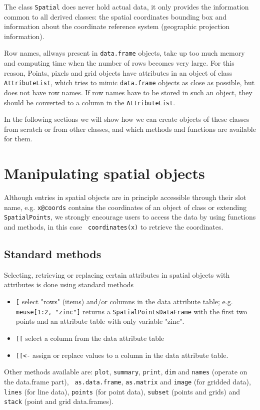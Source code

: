 \documentclass{article}
\begin{document}
The class {\tt Spatial} does never hold actual data, it only provides
the information common to all derived classes: the spatial coordinates
bounding box and information about the coordinate reference system
(geographic projection information).

Row names, allways present in {\tt data.frame} objects, take up too much
memory and computing time when the number of rows becomes very large. For
this reason, Points, pixels and grid objects have attributes in an object
of class {\tt AttributeList}, which tries to mimic {\tt data.frame}
objects as close as possible, but does not have row names. If row names
have to be stored in such an object, they should be converted to a column
in the {\tt AttributeList}.

In the following sections we will show how we can create objects of
these classes from scratch or from other classes, and which methods and
functions are available for them.

\section{Manipulating spatial objects}

Although entries in spatial objects are in principle accessible through
their slot name, e.g. {\tt x@coords} contains the coordinates of an object
of class or extending {\tt SpatialPoints}, we strongly encourage users
to access the data by using functions and methods, in this case {\tt
coordinates(x)} to retrieve the coordinates.

\subsection{Standard methods}

Selecting, retrieving or replacing certain attributes in spatial objects
with attributes is done using standard methods
\begin{itemize}
\item \verb|[| select "rows" (items) and/or columns in the data attribute
table; e.g. {\tt meuse[1:2, "zinc"]} returns a {\tt SpatialPointsDataFrame}
with the first two points and an attribute table with only variable "zinc".
\item \verb|[[| select a column from the data attribute table
\item \verb|[[<-| assign or replace values to a column in the data attribute
table.
\end{itemize}
Other methods available are: {\tt plot}, {\tt summary}, {\tt print},
{\tt dim} and {\tt names} (operate on the data.frame part), {\tt
as.data.frame}, {\tt as.matrix} and {\tt image} (for gridded data),
{\tt lines} (for line data), {\tt points} (for point data), {\tt subset}
(points and grids) and {\tt stack} (point and grid data.frames).
\end{document}
